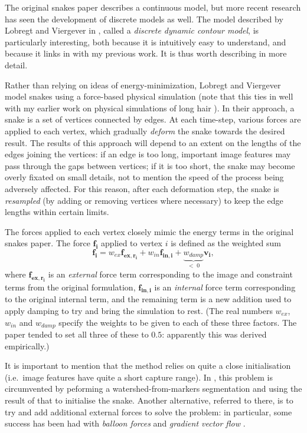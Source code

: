 The original snakes paper describes a continuous model, but more recent research \cite{lobregt95,miller90b,miller90a} has seen the development of discrete models as well. The model described by Lobregt and Viergever in \cite{lobregt95}, called a \emph{discrete dynamic contour model}, is particularly interesting, both because it is intuitively easy to understand, and because it links in with my previous work. It is thus worth describing in more detail.

Rather than relying on ideas of energy-minimization, Lobregt and Viergever model snakes using a force-based physical simulation (note that this ties in well with my earlier work on physical simulations of long hair \cite{gvc08}). In their approach, a snake is a set of vertices connected by edges. At each time-step, various forces are applied to each vertex, which gradually \emph{deform} the snake towards the desired result. The results of this approach will depend to an extent on the lengths of the edges joining the vertices: if an edge is too long, important image features may pass through the gaps between vertices; if it is too short, the snake may become overly fixated on small details, not to mention the speed of the process being adversely affected. For this reason, after each deformation step, the snake is \emph{resampled} (by adding or removing vertices where necessary) to keep the edge lengths within certain limits.

The forces applied to each vertex closely mimic the energy terms in the original snakes paper. The force $\mathbf{f_i}$ applied to vertex $i$ is defined as the weighted sum
%
\[
\mathbf{f_i} = w_{ex}\mathbf{f_{ex,r_i}} + w_{in}\mathbf{f_{in,i}} + \underbrace{w_{damp}}_{< \; 0}\mathbf{v_i},
\]
%
where $\mathbf{f_{ex,r_i}}$ is an \emph{external} force term corresponding to the image and constraint terms from the original formulation, $\mathbf{f_{in,i}}$ is an \emph{internal} force term corresponding to the original internal term, and the remaining term is a new addition used to apply damping to try and bring the simulation to rest. (The real numbers $w_{ex}$, $w_{in}$ and $w_{damp}$ specify the weights to be given to each of these three factors. The paper tended to set all three of these to $0.5$: apparently this was derived empirically.)

It is important to mention that the method relies on quite a close initialisation (i.e.\ image features have quite a short capture range). In \cite{ree05}, this problem is circumvented by peforming a watershed-from-markers segmentation and using the result of that to initialise the snake. Another alternative, referred to there, is to try and add additional external forces to solve the problem: in particular, some success has been had with \emph{balloon forces} \cite{cohen91} and \emph{gradient vector flow} \cite{xu98}.

